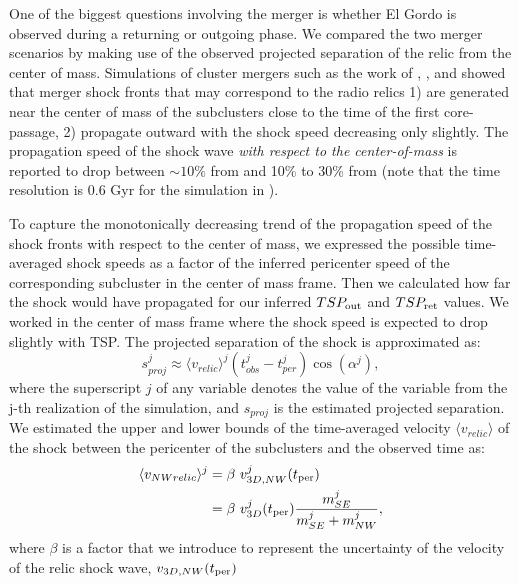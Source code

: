 \documentclass[letterpaper,useAMS,usenatbib]{mn2e}
\begin{document}
One of the biggest questions involving the merger is whether El Gordo is
observed during a returning or outgoing phase. We compared the two merger
scenarios by making use of the observed projected separation of the relic from the
center of mass.
Simulations of cluster mergers such as the work of \citet{Paul2011b},
\citet{VanWeerenRJ2011}, and \citet{Springel2007} showed that merger shock
fronts that may correspond to the radio relics 1) are generated near the
center of mass of the subclusters close to the time of the first
core-passage, 2) propagate outward with the shock speed decreasing only slightly.
The propagation speed of the shock wave {\it with respect to the
center-of-mass} is reported 
to drop between $\sim 10\%$ from \citet{Springel2007} and  
10\% to 30\% from \citet{Paul2011b} (note that the   
 time resolution is 0.6 Gyr for the simulation in \citealt{Paul2011b}).
\par 
To capture the monotonically decreasing trend of the
propagation speed of the shock fronts with respect to the center of
mass, we expressed the possible time-averaged shock speeds as a factor of the inferred
pericenter speed of the corresponding subcluster in the center of mass
 frame. 
Then we calculated how far the shock would have propagated for our inferred
$TSP_{\rm out}$ and $TSP_{\rm ret}$ values. We worked in the center of mass frame where the
shock speed is expected to drop slightly with TSP. 
The projected separation of the shock is approximated as:
\begin{equation}
	s^j_{proj} \approx \langle v_{relic} \rangle^j (t^j_{obs} - t^j_{per})
	\cos(\alpha^j),
	\label{eq:proj_s_model}
\end{equation}
where the superscript $j$ of any variable denotes the value of the
variable from the j-th realization of the simulation, and $s_{proj}$ is the estimated projected
separation. We estimated the upper and lower bounds of the time-averaged velocity
$\langle v_{relic} \rangle$ of the shock between
the pericenter of the subclusters and the observed time as:  
\begin{align}
	\label{eqn:NW_speed}
	\langle v_{NW relic} \rangle^j &= \beta~v^j_{3D, NW}(t_{\rm per}) \\
	&= \beta~v^j_{3D}(t_{\rm per}) \frac{m^j_{SE}}{m^j_{SE} + m^j_{NW}}, 
\end{align}
where  $\beta$ is a factor that we introduce to represent the
uncertainty of the velocity of the relic shock wave, $v_{3D, NW}(t_{\rm per})$ 
\end{document}
